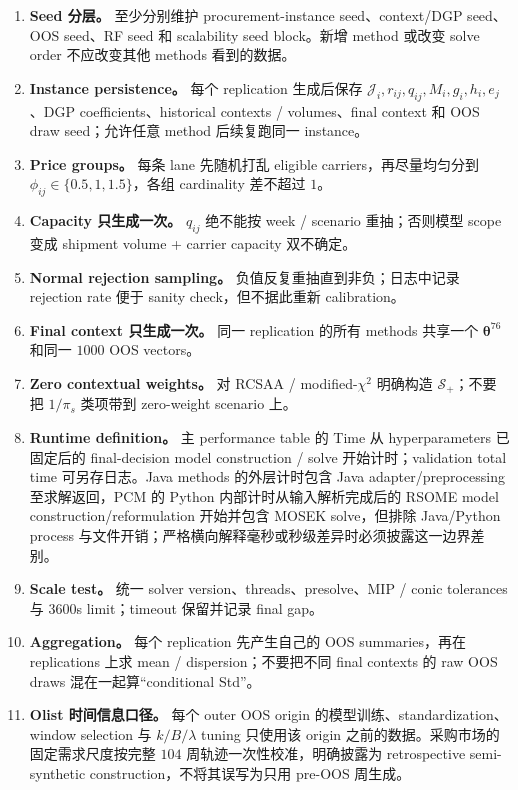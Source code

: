 \documentclass[11pt,a4paper]{ctexart}
\newcommand{\J}{\mathcal J}
\newcommand{\Sset}{\mathcal S}
\begin{document}
\begin{enumerate}[leftmargin=2.4em,itemsep=0.28em]
\item \textbf{Seed 分层。} 至少分别维护 procurement-instance seed、context/DGP seed、OOS seed、RF seed 和 scalability seed block。新增 method 或改变 solve order 不应改变其他 methods 看到的数据。
\item \textbf{Instance persistence。} 每个 replication 生成后保存 $\J_i,r_{ij},q_{ij},M_i,g_i,h_i,e_j$、DGP coefficients、historical contexts / volumes、final context 和 OOS draw seed；允许任意 method 后续复跑同一 instance。
\item \textbf{Price groups。} 每条 lane 先随机打乱 eligible carriers，再尽量均匀分到 $\phi_{ij}\in\{0.5,1,1.5\}$，各组 cardinality 差不超过 $1$。
\item \textbf{Capacity 只生成一次。} $q_{ij}$ 绝不能按 week / scenario 重抽；否则模型 scope 变成 shipment volume + carrier capacity 双不确定。
\item \textbf{Normal rejection sampling。} 负值反复重抽直到非负；日志中记录 rejection rate 便于 sanity check，但不据此重新 calibration。
\item \textbf{Final context 只生成一次。} 同一 replication 的所有 methods 共享一个 $\boldsymbol\theta^{76}$ 和同一 $1000$ OOS vectors。
\item \textbf{Zero contextual weights。} 对 RCSAA / modified-$\chi^2$ 明确构造 $\Sset_+$；不要把 $1/\pi_s$ 类项带到 zero-weight scenario 上。
\item \textbf{Runtime definition。} 主 performance table 的 Time 从 hyperparameters 已固定后的 final-decision model construction / solve 开始计时；validation total time 可另存日志。Java methods 的外层计时包含 Java adapter/preprocessing 至求解返回，PCM 的 Python 内部计时从输入解析完成后的 RSOME model construction/reformulation 开始并包含 MOSEK solve，但排除 Java/Python process 与文件开销；严格横向解释毫秒或秒级差异时必须披露这一边界差别。
\item \textbf{Scale test。} 统一 solver version、threads、presolve、MIP / conic tolerances 与 $3600$s limit；timeout 保留并记录 final gap。
\item \textbf{Aggregation。} 每个 replication 先产生自己的 OOS summaries，再在 replications 上求 mean / dispersion；不要把不同 final contexts 的 raw OOS draws 混在一起算“conditional Std”。
\item \textbf{Olist 时间信息口径。} 每个 outer OOS origin 的模型训练、standardization、window selection 与 $k/B/\lambda$ tuning 只使用该 origin 之前的数据。采购市场的固定需求尺度按完整 $104$ 周轨迹一次性校准，明确披露为 retrospective semi-synthetic construction，不将其误写为只用 pre-OOS 周生成。
\end{enumerate}
\end{document}
